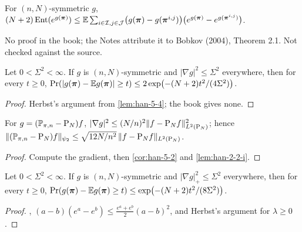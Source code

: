 \begin{lemma}
  \label{lem:han-5-4}
  For $(n,N)$-symmetric $g$,
  $(N+2)\operatorname{Ent}(e^{g(\boldsymbol\pi)})\le\mathbb{E}\sum_{i\in\mathcal I,j\in\mathcal J}\bigl(g(\boldsymbol\pi)-g(\boldsymbol\pi^{i,j})\bigr)\bigl(e^{g(\boldsymbol\pi)}-e^{g(\boldsymbol\pi^{i,j})}\bigr)$.
\end{lemma}
\begin{remark}
  No proof in the book; the Notes attribute it to Bobkov (2004), Theorem 2.1. Not checked against the source.
\end{remark}

\begin{corollary}
  \label{cor:han-5-2}
  Let $0<\Sigma^2<\infty$. If $g$ is $(n,N)$-symmetric and $|\nabla g|^2\le\Sigma^2$ everywhere, then for every $t\ge0$, $\Pr(|g(\boldsymbol\pi)-\mathbb{E} g(\boldsymbol\pi)|\ge t)\le2\exp\bigl(-(N+2)t^2/(4\Sigma^2)\bigr)$.
\end{corollary}
\begin{proof}
  Herbst's argument from \cref{lem:han-5-4}; the book gives none.
\end{proof}

\begin{corollary}
  \label{cor:han-5-3}
  For $g=(\mathbb{P}_{\pi,n}-\mathrm{P}_N)f$, $|\nabla g|^2\le(N/n)^2\|f-\mathrm{P}_N f\|_{L^2(\mathrm{P}_N)}^2$; hence $\|(\mathbb{P}_{\pi,n}-\mathrm{P}_N)f\|_{\psi_2}\le\sqrt{12N/n^2}\,\|f-\mathrm{P}_N f\|_{L^2(\mathrm{P}_N)}$.
\end{corollary}
\begin{proof}
  Compute the gradient, then \cref{cor:han-5-2} and \cref{lem:han-2-2-i}.
\end{proof}

\begin{corollary}
  \label{cor:han-5-4-upper}
  Let $0<\Sigma^2<\infty$. If $g$ is $(n,N)$-symmetric and $|\nabla g|_+^2\le\Sigma^2$ everywhere, then for every $t\ge0$, $\Pr(g(\boldsymbol\pi)-\mathbb{E} g(\boldsymbol\pi)\ge t)\le\exp\bigl(-(N+2)t^2/(8\Sigma^2)\bigr)$.
\end{corollary}
\begin{proof}
  , $(a-b)(e^a-e^b)\le\frac{e^a+e^b}2(a-b)^2$, and Herbst's argument for $\lambda\ge0$.
\end{proof}

